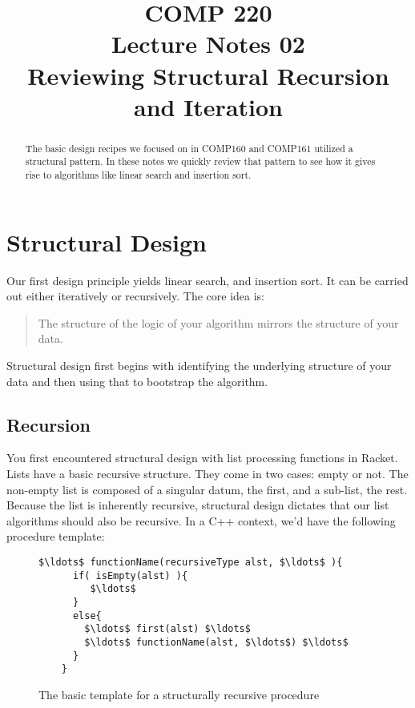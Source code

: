 \documentclass[nobib]{tufte-handout}
\title{COMP 220 \\ Lecture Notes 02 \\ Reviewing Structural Recursion and Iteration}
\begin{document}
\maketitle

\begin{abstract}
  The basic design recipes we focused on in COMP160 and COMP161 utilized a structural pattern. In these notes we quickly review that pattern to see how it gives rise to algorithms like linear search and insertion sort.
\end{abstract}

\section{Structural Design}

Our first design principle yields linear search, and insertion sort. It can be carried out either iteratively or recursively. The core idea is:

\begin{quote}
  The structure of the logic of your algorithm mirrors the structure of your data.
\end{quote}

Structural design first begins with identifying the underlying structure of your data and then using that to bootstrap the algorithm.

\subsection{Recursion}

You first encountered structural design with list processing functions in Racket. Lists have a basic recursive structure. They come in two cases: empty or not. The non-empty list is composed of a singular datum, the first, and a sub-list, the rest. Because the list is inherently recursive, structural design dictates that our list algorithms should also be recursive. In a C++ context, we'd have the following procedure template:

\begin{figure}
  \begin{lstlisting}[mathescape=true]
    $\ldots$ functionName(recursiveType alst, $\ldots$ ){
      if( isEmpty(alst) ){
         $\ldots$
      }
      else{
        $\ldots$ first(alst) $\ldots$
        $\ldots$ functionName(alst, $\ldots$) $\ldots$
      }
    }
  \end{lstlisting}
\label{structRec}
\caption{The basic template for a structurally recursive procedure}
\end{figure}
\end{document}
